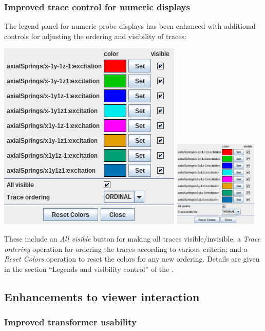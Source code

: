 \documentclass{article}
\begin{document}
\subsubsection{Improved trace control for numeric displays}

The legend panel for numeric probe displays has been enhanced with
additional controls for adjusting the ordering and visibility of
traces:
%
\begin{center}
\iflatexml
 \includegraphics[]{images/newlegend}
\else
 \includegraphics[width=0.3\textwidth]{images/newlegend}
\fi
\end{center}
%
These include an {\it All visible} button for making all traces
visible/invisible; a {\it Trace ordering} operation for ordering the
traces according to various criteria; and a {\it Reset Colors}
operation to reset the colors for any new ordering.  Details are given
in the section ``Legends and visibility control'' of the
.

\subsection*{Enhancements to viewer interaction}

\subsubsection{Improved transformer usability}
\end{document}
